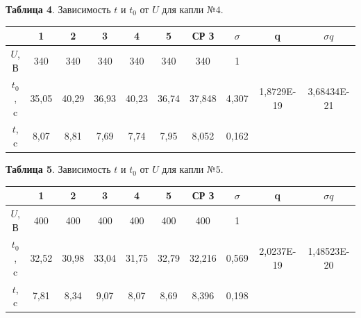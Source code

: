 \documentclass[11pt,a4paper]{article}
\begin{document}
\space
\begin{table}
	\begin{center}
		\textbf{Таблица 4}. Зависимость $t$ и $t_0$ от $U$ для капли $№4$.\\
	\begin{tabular}{|c|c|c|c|c|c|c|c|c|c|}
		
			\hline
			 & \textbf{1} & \textbf{2} & \textbf{3} &\textbf{4} &\textbf{5} & СР З & $\sigma$  & q& $\sigma q$  \\ \hline
			$U$, В & 340 & 340 & 340 & 340 & 340 &  340 &  1 \\ \hline
			$t_0$, c  & 35,05  & 40,29 & 36,93 & 40,23 & 36,74 & 37,848  & 4,307 & 1,8729E-19
 & 3,68434E-21
\\ \hline
			$t$, c   & 8,07 & 8,81 & 7,69 & 7,74 & 7,95 & 8,052 & 0,162\\ \hline
	\end{tabular}
	\end{center}
\end{table}
\space\begin{table}
	\begin{center}
		\textbf{Таблица 5}. Зависимость $t$ и $t_0$ от $U$ для капли $№5$.\\
	\begin{tabular}{|c|c|c|c|c|c|c|c|c|c|}
		
			\hline
			 & \textbf{1} & \textbf{2} & \textbf{3} &\textbf{4} &\textbf{5} & СР З & $\sigma$  & q& $\sigma q$ \\ \hline
			$U$, В & 400 & 400 & 400 & 400 & 400 &  400 &  1 \\ \hline
			$t_0$, c  & 32,52 & 30,98 & 33,04 & 31,75 & 32,79 &  32,216 & 0,569 & 2,0237E-19
 & 1,48523E-20
\\ \hline
			$t$, c   & 7,81 & 8,34 & 9,07 & 8,07 & 8,69 & 8,396 & 0,198 \\ \hline
	\end{tabular}
	\end{center}
\end{table}
\end{document}

